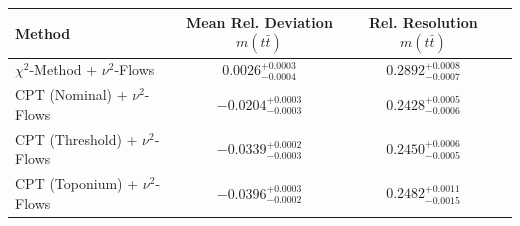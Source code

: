     \begin{tabular}{lccc}
        \toprule
        Method & Mean Rel. Deviation $m(t\bar{t})$ & Rel. Resolution $m(t\bar{t})$ \\
        \midrule
        $\chi^2$-Method + $\nu^2$-Flows & $0.0026^{+0.0003}_{-0.0004}$ & $0.2892^{+0.0008}_{-0.0007}$ \\
        CPT (Nominal) + $\nu^2$-Flows & $-0.0204^{+0.0003}_{-0.0003}$ & $0.2428^{+0.0005}_{-0.0006}$ \\
        CPT (Threshold) + $\nu^2$-Flows & $-0.0339^{+0.0002}_{-0.0003}$ & $0.2450^{+0.0006}_{-0.0005}$ \\
        CPT (Toponium) + $\nu^2$-Flows & $-0.0396^{+0.0003}_{-0.0002}$ & $0.2482^{+0.0011}_{-0.0015}$ \\
        \bottomrule
    \end{tabular}